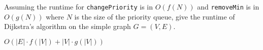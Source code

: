 \question Assuming the runtime for \lstinline$changePriority$ is in $O(f(N))$
and \lstinline$removeMin$ is in $O(g(N))$ where $N$ is the size of the priority
queue, give the runtime of Dijkstra's algorithm on the simple graph
$G = (V, E)$.

\begin{solution}[0.5in]
$O(|E| \cdot f(|V|) + |V| \cdot g(|V|))$
\end{solution}
